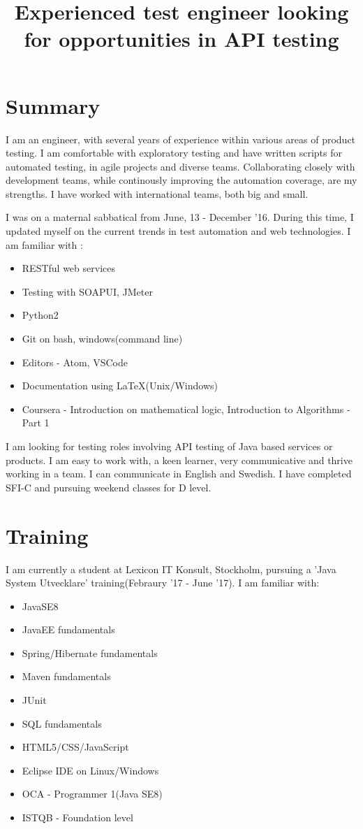 \documentclass[12pt,a4paper,sans]{moderncv} %
\title{Experienced test engineer looking for opportunities in API testing}
\begin{document}
\makecvtitle


\section{Summary}
I am an engineer, with several years of experience within various areas of product testing. I am comfortable with exploratory testing and have written scripts for automated testing, in
agile projects and diverse teams. Collaborating closely with development teams, while continously improving the automation coverage, are my strengths.
I have worked with international teams, both big and small.

\hfill \break
I was on a maternal sabbatical from June, 13 - December '16. During this time, I updated myself on the current trends in test automation and web technologies. I am
familiar with :

	\begin{itemize}
	\item RESTful web services
	\item Testing with SOAPUI, JMeter 
	\item Python2
	\item Git on bash, windows(command line)
	\item Editors - Atom, VSCode
	\item Documentation using LaTeX(Unix/Windows)
	\item Coursera - Introduction on mathematical logic, Introduction to Algorithms - Part 1
	\end{itemize}	

\hfill \break
I am looking for testing roles involving API testing of Java based services or products. I am easy to work with,
a keen learner, very communicative and thrive working in a team. I can communicate in English and Swedish.
I have completed SFI-C and pursuing weekend classes for D level.

\section{Training}
I am currently a student at Lexicon IT Konsult, Stockholm, pursuing a 'Java System Utvecklare' training(Febraury '17 - June '17). I am familiar with:
	\begin{itemize}
	\item JavaSE8
	\item JavaEE fundamentals
	\item Spring/Hibernate fundamentals
	\item Maven fundamentals
	\item JUnit
	\item SQL fundamentals
	\item HTML5/CSS/JavaScript
	\item Eclipse IDE on Linux/Windows
	\item OCA - Programmer 1(Java SE8)
	\item ISTQB - Foundation level
 	\end{itemize}
\end{document}
